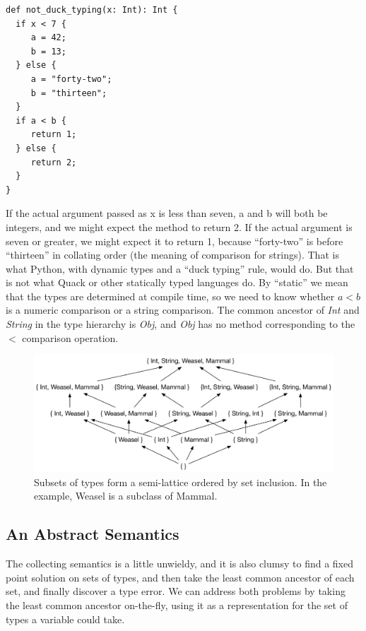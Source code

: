 \documentclass[11pt]{article}
\begin{document}
\begin{verbatim}
def not_duck_typing(x: Int): Int {
  if x < 7 {
     a = 42; 
     b = 13; 
  } else {
     a = "forty-two"; 
     b = "thirteen"; 
  }
  if a < b {
     return 1;
  } else {
     return 2; 
  }
}
\end{verbatim}

If the actual argument passed as x is less than seven, a and b will
both be integers, and we might expect the method to return 2.  If the
actual argument is seven or greater, we might expect it to return 1,
because ``forty-two'' is before ``thirteen'' in collating order (the
meaning of comparison for strings).   That is what Python, with
dynamic types and a ``duck typing'' rule, would do.  But that is not
what Quack or other statically typed languages do.  By ``static'' we
mean that the types are determined at compile time, so we need to know
whether \( a < b \) is a numeric comparison or a string comparison.
The common ancestor of \emph{Int} and \emph{String} in the type
hierarchy is \emph{Obj}, and \emph{Obj} has no method
corresponding to the $<$ comparison operation.  

\begin{figure}
\centerline{\includegraphics[scale=0.7]{img/Collecting-lattice.pdf}}
\caption{Subsets of types form a semi-lattice ordered by set
  inclusion.  In the example, Weasel is a subclass of Mammal.}
\label{fig-set-lattice}
\end{figure}

\subsection{An Abstract Semantics}

The collecting semantics is a little unwieldy, and it is also clumsy
to find a fixed point solution on sets of types, and then take the least
common ancestor of each set, and finally discover a type error.  We
can address both  problems by taking the least common ancestor
on-the-fly, using it as a representation for the set of types a
variable could take. 
\end{document}
